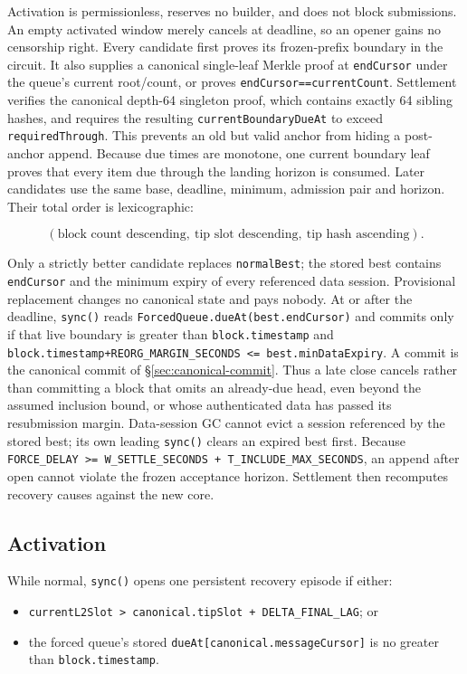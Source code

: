 \documentclass[a4paper,11pt]{article}
\newcommand{\code}[1]{\nolinkurl{#1}}
\begin{document}
Activation is permissionless, reserves no builder, and does not block
submissions.  An empty activated window merely cancels at deadline, so an
opener gains no censorship right.  Every candidate first
proves its frozen-prefix boundary in the circuit.  It also supplies a canonical
single-leaf Merkle proof at \code{endCursor} under the queue's current
root/count, or proves \code{endCursor==currentCount}.  Settlement verifies the
canonical depth-64 singleton proof, which contains exactly 64 sibling hashes,
and requires the resulting
\code{currentBoundaryDueAt} to exceed
\code{requiredThrough}.  This prevents an old but valid anchor from hiding a
post-anchor append.  Because due times are monotone, one current boundary leaf
proves that every item due through the landing horizon is consumed.  Later
candidates use the same base, deadline, minimum, admission pair and horizon.
Their total order is lexicographic:

\[
(\text{block count descending},\ \text{tip slot descending},\
 \text{tip hash ascending}).
\]

Only a strictly better candidate replaces \code{normalBest}; the stored best
contains \code{endCursor} and the minimum expiry of every referenced data
session.  Provisional replacement changes no canonical state and pays nobody.
At or after the deadline, \code{sync()} reads
\code{ForcedQueue.dueAt(best.endCursor)} and commits only if that live boundary
is greater than \code{block.timestamp} and
\code{block.timestamp+REORG_MARGIN_SECONDS <= best.minDataExpiry}.  A commit
is the canonical commit of \S\ref{sec:canonical-commit}.  Thus a late
close cancels rather than committing a block that omits an already-due head,
even beyond the assumed inclusion bound, or whose authenticated data has
passed its resubmission margin.  Data-session GC cannot evict a session
referenced by the stored best; its own leading \code{sync()} clears an expired
best first.  Because
\code{FORCE_DELAY >= W_SETTLE_SECONDS + T_INCLUDE_MAX_SECONDS}, an append after
open cannot violate the frozen acceptance horizon.  Settlement then recomputes
recovery causes against the new core.

\subsection{Activation}

While normal, \code{sync()} opens one persistent recovery episode if either:

\begin{itemize}
\item \code{currentL2Slot > canonical.tipSlot + DELTA_FINAL_LAG}; or
\item the forced queue's stored \code{dueAt[canonical.messageCursor]} is no
greater than \code{block.timestamp}.
\end{itemize}
\end{document}
